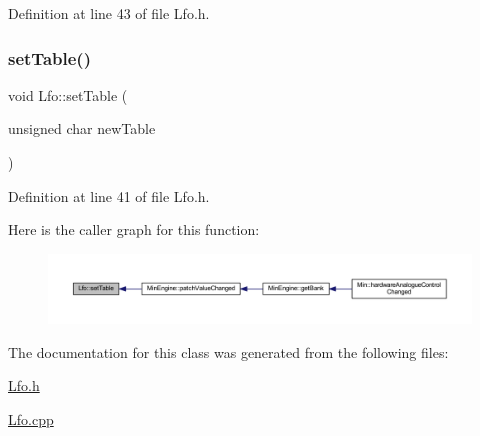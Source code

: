 Definition at line 43 of file Lfo.\+h.

\mbox{\label{class_lfo_a6c0c12b49e8b69c4e839eed57130d2ad}} 
\subsubsection{\texorpdfstring{set\+Table()}{setTable()}}
{\footnotesize\ttfamily void Lfo\+::set\+Table (\begin{DoxyParamCaption}\item[{unsigned char}]{new\+Table }\end{DoxyParamCaption})\hspace{0.3cm}{\ttfamily [inline]}}



Definition at line 41 of file Lfo.\+h.

Here is the caller graph for this function\+:
\nopagebreak
\begin{figure}[H]
\begin{center}
\leavevmode
\includegraphics[width=350pt]{d6/d5f/class_lfo_a6c0c12b49e8b69c4e839eed57130d2ad_icgraph}
\end{center}
\end{figure}


The documentation for this class was generated from the following files\+:\begin{DoxyCompactItemize}
\item 
\hyperlink{_lfo_8h}{Lfo.\+h}\item 
\hyperlink{_lfo_8cpp}{Lfo.\+cpp}\end{DoxyCompactItemize}

